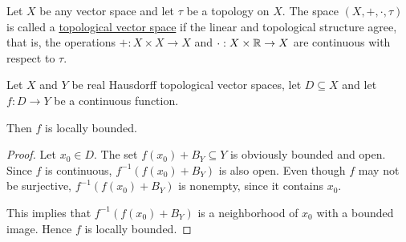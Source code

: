 \begin{definition}\label{def:topological_vector_space}
  Let $X$ be any vector space and let $\tau$ be a topology on $X$. The space $(X, +, \cdot, \tau)$ is called a \uline{topological vector space} if the linear and topological structure agree, that is, the operations $+: X \times X \to X$ and $\cdot: X \times \mathbb{R} \to X$ are continuous with respect to $\tau$.
\end{definition}

\begin{proposition}\label{thm:continuous_implies_locally_bounded}
  Let $X$ and $Y$ be real Hausdorff topological vector spaces, let $D \subseteq X$ and let $f: D \to Y$ be a continuous function.

  Then $f$ is locally bounded.
\end{proposition}
\begin{proof}
  Let $x_0 \in D$. The set $f(x_0) + B_Y \subseteq Y$ is obviously bounded and open. Since $f$ is continuous, $f^{-1}(f(x_0) + B_Y)$ is also open. Even though $f$ may not be surjective, $f^{-1}(f(x_0) + B_Y)$ is nonempty, since it contains $x_0$.

  This implies that $f^{-1}(f(x_0) + B_Y)$ is a neighborhood of $x_0$ with a bounded image. Hence $f$ is locally bounded.
\end{proof}

